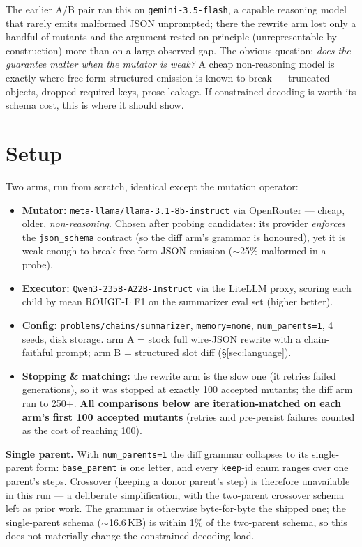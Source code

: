 \documentclass[11pt]{article}
\newcommand{\armA}{\textcolor{bad}{arm A}}
\newcommand{\armB}{\textcolor{accent}{arm B}}
\begin{document}
The earlier A/B pair ran this on \texttt{gemini-3.5-flash}, a capable reasoning model that
rarely emits malformed JSON unprompted; there the rewrite arm lost only a handful of mutants
and the argument rested on principle (unrepresentable-by-construction) more than on a large
observed gap. The obvious question: \emph{does the guarantee matter when the mutator is
weak?} A cheap non-reasoning model is exactly where free-form structured emission is known to
break --- truncated objects, dropped required keys, prose leakage. If constrained decoding is
worth its schema cost, this is where it should show.

\section{Setup}
\label{sec:setup}
Two arms, run from scratch, identical except the mutation operator:
\begin{itemize}
  \item \textbf{Mutator:} \texttt{meta-llama/llama-3.1-8b-instruct} via OpenRouter --- cheap,
  older, \emph{non-reasoning}. Chosen after probing candidates: its provider
  \emph{enforces} the \texttt{json\_schema} contract (so the diff arm's grammar is honoured),
  yet it is weak enough to break free-form JSON emission ($\sim$25\% malformed in a probe).
  \item \textbf{Executor:} \texttt{Qwen3-235B-A22B-Instruct} via the LiteLLM proxy, scoring
  each child by mean ROUGE-L F1 on the summarizer eval set (higher better).
  \item \textbf{Config:} \texttt{problems/chains/summarizer}, \texttt{memory=none},
  \texttt{num\_parents=1}, 4 seeds, disk storage. \armA{} = stock full wire-JSON rewrite with
  a chain-faithful prompt; \armB{} = structured slot diff (\S\ref{sec:language}).
  \item \textbf{Stopping \& matching:} the rewrite arm is the slow one (it retries failed
  generations), so it was stopped at exactly 100 accepted mutants; the diff arm ran to 250+.
  \textbf{All comparisons below are iteration-matched on each arm's first 100 accepted
  mutants} (retries and pre-persist failures counted as the cost of reaching 100).
\end{itemize}

\noindent\textbf{Single parent.} With \texttt{num\_parents=1} the diff grammar collapses to
its single-parent form: \texttt{base\_parent} is one letter, and every \texttt{keep}-id enum
ranges over one parent's steps. Crossover (keeping a donor parent's step) is therefore
unavailable in this run --- a deliberate simplification, with the two-parent crossover schema
left as prior work. The grammar is otherwise byte-for-byte the shipped one; the single-parent
schema ($\sim$16.6\,KB) is within 1\% of the two-parent schema, so this does not materially
change the constrained-decoding load.
\end{document}
